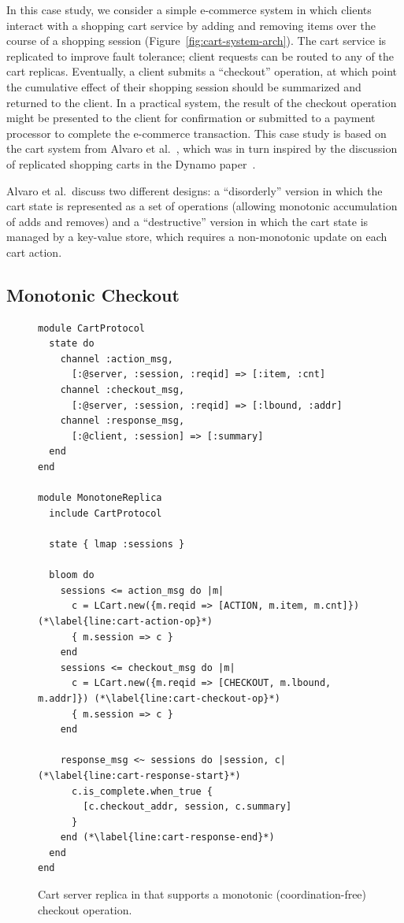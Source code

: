 In this case study, we consider a simple e-commerce system in which clients
interact with a shopping cart service by adding and removing items over the
course of a shopping session (Figure~\ref{fig:cart-system-arch}). The cart
service is replicated to improve fault tolerance; client requests can be routed
to any of the cart replicas. Eventually, a client submits a ``checkout''
operation, at which point the cumulative effect of their shopping session should
be summarized and returned to the client. In a practical system, the result of
the checkout operation might be presented to the client for confirmation or
submitted to a payment processor to complete the e-commerce transaction. This
case study is based on the cart system from Alvaro et al.~\cite{Alvaro2011},
which was in turn inspired by the discussion of replicated shopping carts in the
Dynamo paper~\cite{DeCandia2007}.

Alvaro et al.\ discuss two different designs: a ``disorderly'' version in which
the cart state is represented as a set of operations (allowing monotonic
accumulation of adds and removes) and a ``destructive'' version in which the
cart state is managed by a key-value store, which requires a non-monotonic
update on each cart action.

\subsection{Monotonic Checkout}
\label{sec:monotone-checkout}

\begin{figure}[t]
\begin{scriptsize}
\begin{lstlisting}
module CartProtocol
  state do
    channel :action_msg,
      [:@server, :session, :reqid] => [:item, :cnt]
    channel :checkout_msg,
      [:@server, :session, :reqid] => [:lbound, :addr]
    channel :response_msg,
      [:@client, :session] => [:summary]
  end
end

module MonotoneReplica
  include CartProtocol

  state { lmap :sessions }

  bloom do
    sessions <= action_msg do |m|
      c = LCart.new({m.reqid => [ACTION, m.item, m.cnt]}) (*\label{line:cart-action-op}*)
      { m.session => c }
    end
    sessions <= checkout_msg do |m|
      c = LCart.new({m.reqid => [CHECKOUT, m.lbound, m.addr]}) (*\label{line:cart-checkout-op}*)
      { m.session => c }
    end

    response_msg <~ sessions do |session, c| (*\label{line:cart-response-start}*)
      c.is_complete.when_true {
        [c.checkout_addr, session, c.summary]
      }
    end (*\label{line:cart-response-end}*)
  end
end
\end{lstlisting}
\end{scriptsize}
\caption{Cart server replica in \lang that supports a monotonic
  (coordination-free) checkout operation.}
\label{fig:monotone-cart}
\end{figure}

